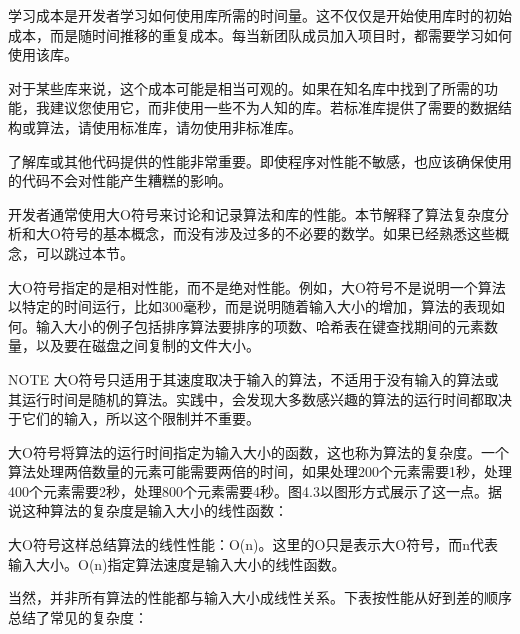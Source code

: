 
学习成本是开发者学习如何使用库所需的时间量。这不仅仅是开始使用库时的初始成本，而是随时间推移的重复成本。每当新团队成员加入项目时，都需要学习如何使用该库。

对于某些库来说，这个成本可能是相当可观的。如果在知名库中找到了所需的功能，我建议您使用它，而非使用一些不为人知的库。若标准库提供了需要的数据结构或算法，请使用标准库，请勿使用非标准库。


了解库或其他代码提供的性能非常重要。即使程序对性能不敏感，也应该确保使用的代码不会对性能产生糟糕的影响。


开发者通常使用大O符号来讨论和记录算法和库的性能。本节解释了算法复杂度分析和大O符号的基本概念，而没有涉及过多的不必要的数学。如果已经熟悉这些概念，可以跳过本节。

大O符号指定的是相对性能，而不是绝对性能。例如，大O符号不是说明一个算法以特定的时间运行，比如300毫秒，而是说明随着输入大小的增加，算法的表现如何。输入大小的例子包括排序算法要排序的项数、哈希表在键查找期间的元素数量，以及要在磁盘之间复制的文件大小。

\begin{myNotic}{NOTE}
大O符号只适用于其速度取决于输入的算法，不适用于没有输入的算法或其运行时间是随机的算法。实践中，会发现大多数感兴趣的算法的运行时间都取决于它们的输入，所以这个限制并不重要。
\end{myNotic}

大O符号将算法的运行时间指定为输入大小的函数，这也称为算法的复杂度。一个算法处理两倍数量的元素可能需要两倍的时间，如果处理200个元素需要1秒，处理400个元素需要2秒，处理800个元素需要4秒。图4.3以图形方式展示了这一点。据说这种算法的复杂度是输入大小的线性函数：


大O符号这样总结算法的线性性能：O(n)。这里的O只是表示大O符号，而n代表输入大小。O(n)指定算法速度是输入大小的线性函数。

当然，并非所有算法的性能都与输入大小成线性关系。下表按性能从好到差的顺序总结了常见的复杂度：

